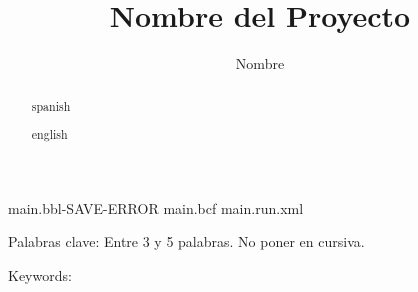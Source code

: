 \documentclass{tesisUNADE}
\title{Nombre del Proyecto}
\author{Nombre}
\begin{document}
\maketitle
	main.bbl-SAVE-ERROR
	main.bcf
	main.run.xml
\begin{abstract}{spanish}
\lipsum[1]

\end{abstract}
Palabras clave: Entre 3 y 5 palabras. No poner en cursiva. 
\begin{abstract}{english}
\lipsum[1]
\end{abstract}
Keywords: 






\renewcommand{\contentsname}{Tabla de contenido}
\tableofcontents
\setcounter{page}{1}
\renewcommand{\listfigurename}{Tabla de figuras}
\renewcommand{\listtablename}{Tabla de tablas}
\listoftables
\listoffigures




\newpage
{}
\setcounter{page}{1}








\clearpage
\printbibliography
\end{document}
